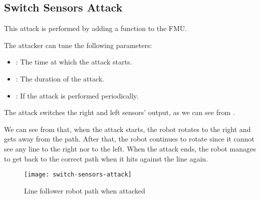 \subsection{Switch Sensors Attack}

This attack is performed by adding a  function to the
 FMU\@.

The attacker can tune the following parameters:
\begin{itemize}
	\item {}: The time at which the attack starts.
	\item {}: The duration of the attack.
	\item {}: If  the attack is performed
		periodically.
\end{itemize}

The attack switches the right and left sensors' output, as we can see from
.



We can see from  that, when the attack
starts, the robot rotates to the right and gets away from the path. After that,
the robot continues to rotate since it cannot see any line to the right nor to
the left. When the attack ends, the robot manages to get back to the correct
path when it hits against the line again.

\begin{figure}[htb]
	\centering
	\texttt{[image: switch-sensors-attack]}
	\caption{Line follower robot path when
	attacked}\label{fig:switchsensorsatkresult}
\end{figure}
